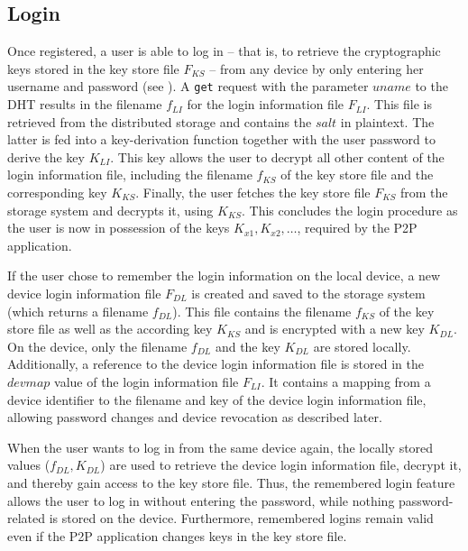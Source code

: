 \subsection{Login} 

Once registered, a user is able to log in -- that is, to retrieve the
cryptographic keys stored in the key store file $F_{KS}$ -- 
from any device by only entering her username and password (see ).
%
A \texttt{get} request with the parameter $uname$ to the DHT results in the 
filename $f_{LI}$ for the login information file $F_{LI}$. 
This file is retrieved from the distributed storage and contains the $salt$ in plaintext.
The latter is fed into a key-derivation function together with the user password to derive the key $K_{LI}$.
This key allows the user to decrypt all other content of the login information file,
including the filename $f_{KS}$ of the key store file and the corresponding key $K_{KS}$.
Finally, the user fetches the key store file $F_{KS}$ from the storage system 
and decrypts it, using $K_{KS}$. 
This concludes the login procedure as the user is now in possession
of the keys $K_{x1}, K_{x2}, \dots$, required by the P2P application.

If the user chose to remember the login information on the local device,
a new device login information file $F_{DL}$ is created and saved to the storage system
(which returns a filename $f_{DL}$). This file contains the filename
$f_{KS}$ of the key store file as well as the according key $K_{KS}$ and is encrypted
with a new key $K_{DL}$. On the device, only the filename $f_{DL}$ and the key $K_{DL}$
are stored locally.
Additionally, a reference to the device login information file is stored in the $devmap$ value
of the login information file $F_{LI}$. It contains a mapping from a device identifier to the filename
and key of the device login information file, allowing password changes and device revocation 
as described later.

When the user wants to log in from the same device again, the
locally stored values ($f_{DL}, K_{DL}$) are used to retrieve the device login
information file, decrypt it, and thereby gain access to the key store
file. Thus, the remembered login feature allows the user to log in
without entering the password, while nothing password-related is
stored on the device. Furthermore, remembered logins remain valid
even if the P2P application changes keys in the key store file.

